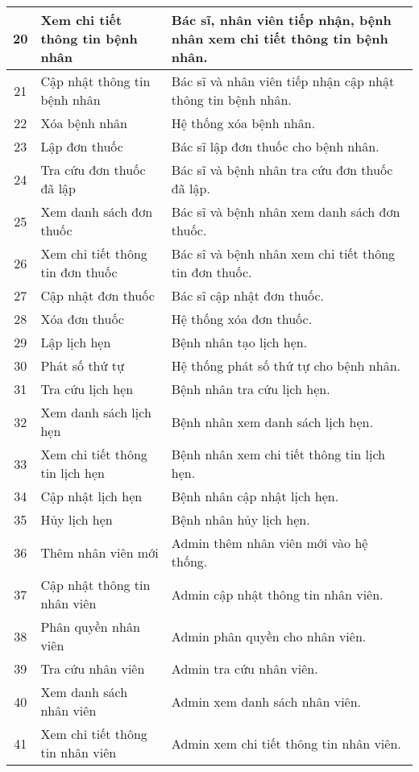 \begin{longtable}{|c|p{4cm}|p{8cm}|}
  \hline
  20 & Xem chi tiết thông tin bệnh nhân & Bác sĩ, nhân viên tiếp nhận, bệnh nhân xem chi tiết thông tin bệnh nhân. \\
  \hline
  21 & Cập nhật thông tin bệnh nhân & Bác sĩ và nhân viên tiếp nhận cập nhật thông tin bệnh nhân. \\
  \hline
  22 & Xóa bệnh nhân & Hệ thống xóa bệnh nhân. \\
  \hline
  23 & Lập đơn thuốc & Bác sĩ lập đơn thuốc cho bệnh nhân. \\
  \hline
  24 & Tra cứu đơn thuốc đã lập & Bác sĩ và bệnh nhân tra cứu đơn thuốc đã lập. \\
  \hline
  25 & Xem danh sách đơn thuốc & Bác sĩ và bệnh nhân xem danh sách đơn thuốc. \\
  \hline
  26 & Xem chi tiết thông tin đơn thuốc & Bác sĩ và bệnh nhân xem chi tiết thông tin đơn thuốc. \\
  \hline
  27 & Cập nhật đơn thuốc & Bác sĩ cập nhật đơn thuốc. \\
  \hline
  28 & Xóa đơn thuốc & Hệ thống xóa đơn thuốc. \\
  \hline
  29 & Lập lịch hẹn & Bệnh nhân tạo lịch hẹn. \\
  \hline
  30 & Phát số thứ tự & Hệ thống phát số thứ tự cho bệnh nhân. \\
  \hline
  31 & Tra cứu lịch hẹn & Bệnh nhân tra cứu lịch hẹn. \\
  \hline
  32 & Xem danh sách lịch hẹn & Bệnh nhân xem danh sách lịch hẹn. \\
  \hline
  33 & Xem chi tiết thông tin lịch hẹn & Bệnh nhân xem chi tiết thông tin lịch hẹn. \\
  \hline
  34 & Cập nhật lịch hẹn & Bệnh nhân cập nhật lịch hẹn. \\
  \hline
  35 & Hủy lịch hẹn & Bệnh nhân hủy lịch hẹn. \\
  \hline
  36 & Thêm nhân viên mới & Admin thêm nhân viên mới vào hệ thống. \\
  \hline
  37 & Cập nhật thông tin nhân viên & Admin cập nhật thông tin nhân viên. \\
  \hline
  38 & Phân quyền nhân viên & Admin phân quyền cho nhân viên. \\
  \hline
  39 & Tra cứu nhân viên & Admin tra cứu nhân viên. \\
  \hline
  40 & Xem danh sách nhân viên & Admin xem danh sách nhân viên. \\
  \hline
  41 & Xem chi tiết thông tin nhân viên & Admin xem chi tiết thông tin nhân viên. \\

\end{longtable}
